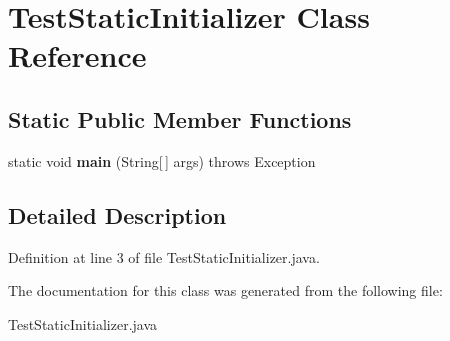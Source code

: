 \section{Test\-Static\-Initializer Class Reference}
\label{classTestStaticInitializer}
\subsection*{Static Public Member Functions}
\begin{CompactItemize}
\item 
static void {\bf main} (String[$\,$] args)  throws Exception     \label{classTestStaticInitializer_592bb35ef25cd6e8bd64d13833401995}

\end{CompactItemize}


\subsection{Detailed Description}




Definition at line 3 of file Test\-Static\-Initializer.java.

The documentation for this class was generated from the following file:\begin{CompactItemize}
\item 
Test\-Static\-Initializer.java\end{CompactItemize}
